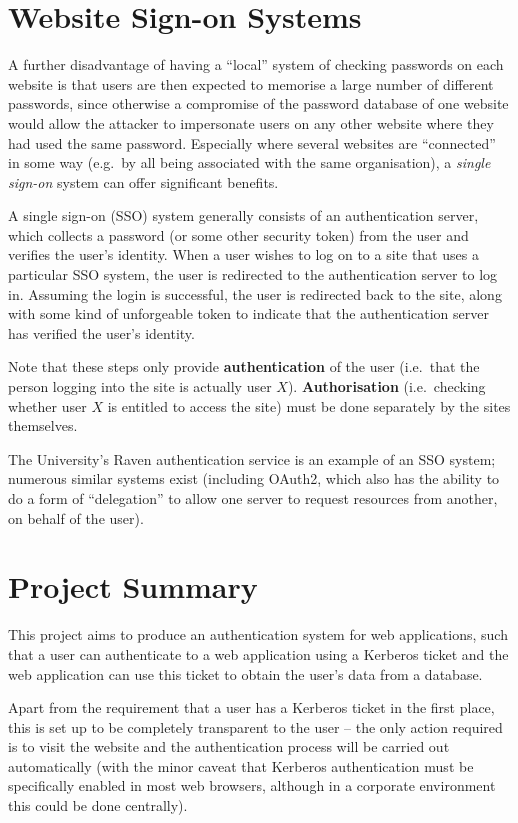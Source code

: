\documentclass[12pt]{report}
\begin{document}
\section{Website Sign-on Systems}
A further disadvantage of having a ``local'' system of checking passwords on each website is that users are then expected to memorise a large number of different passwords, since otherwise a compromise of the password database of one website would allow the attacker to impersonate users on any other website where they had used the same password. Especially where several websites are ``connected'' in some way (e.g.\ by all being associated with the same organisation), a \textit{single sign-on} system can offer significant benefits.

A single sign-on (SSO) system generally consists of an authentication server, which collects a password (or some other security token) from the user and verifies the user's identity. When a user wishes to log on to a site that uses a particular SSO system, the user is redirected to the authentication server to log in. Assuming the login is successful, the user is redirected back to the site, along with some kind of unforgeable token to indicate that the authentication server has verified the user's identity.

Note that these steps only provide \textbf{authentication} of the user (i.e.\ that the person logging into the site is actually user $X$). \textbf{Authorisation} (i.e.\ checking whether user $X$ is entitled to access the site) must be done separately by the sites themselves.

The University's Raven authentication service is an example of an SSO system; numerous similar systems exist (including OAuth2, which also has the ability to do a form of ``delegation'' to allow one server to request resources from another, on behalf of the user\cite{Oracle-OAuth2}).

\section{Project Summary}
This project aims to produce an authentication system for web applications, such that a user can authenticate to a web application using a Kerberos ticket and the web application can use this ticket to obtain the user's data from a database.

Apart from the requirement that a user has a Kerberos ticket in the first place, this is set up to be completely transparent to the user -- the only action required is to visit the website and the authentication process will be carried out automatically (with the minor caveat that Kerberos authentication must be specifically enabled in most web browsers, although in a corporate environment this could be done centrally).
\end{document}
